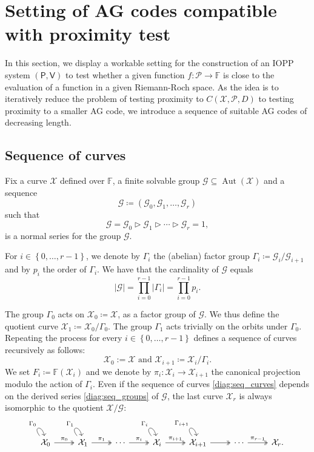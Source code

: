 \documentclass[10pt,a4paper]{article}
\newcommand\F{\mathbb{F}}
\DeclareMathOperator{\Aut}{Aut}
\newcommand\prover{\mathsf{P}}
\newcommand\verifier{\mathsf{V}}
\renewcommand{\vec}[1]{\boldsymbol{#1}}
\newcommand{\set}[1]{\left\{#1\right\}}
\newcommand{\size}[1]{\left|#1\right|}
\newcommand{\range}[1]{\set{0,\dots,#1-1}}
\newcommand\calX{\mathcal{X}}
\newcommand\calP{\mathcal{P}}
\newcommand\calG{\mathcal{G}}
\newcommand\seqG{\vec{\calG}}
\newcommand\mydef{\coloneqq}
\theoremstyle{plain}
\theoremstyle{plain}
\theoremstyle{definition}
\theoremstyle{remark}
\theoremstyle{plain}
\begin{document}
\section{Setting of AG codes compatible with proximity test}\label{sec:foldable}

In this section, we display a workable setting for the construction of an IOPP system $(\prover, \verifier)$ to test whether a given function $f : \calP \rightarrow \F$ is close to the evaluation of a function in a given Riemann-Roch space. As the idea is to iteratively reduce the problem of testing proximity to $C(\calX, \calP, D)$ to testing proximity to a smaller AG code, we introduce a sequence of suitable AG codes of decreasing length.

\subsection{Sequence of curves}\label{subsec:seq-curves}
Fix a curve $\calX$ defined over $\F$, a finite solvable group $\calG \subseteq \Aut(\calX)$ and a sequence \[\seqG \mydef (\calG_0, \calG_1, \dots, \calG_r)\] such that 
\begin{equation}\label{diag:seq_groups}
	\calG=\calG_0 \vartriangleright \calG_1 \vartriangleright \cdots \vartriangleright \calG_r = 1,
\end{equation}
is a normal series for the group $\calG$.

For $i \in \range{r}$, we denote by $\Gamma_i$ the (abelian) factor group $\Gamma_i \mydef \calG_i /\calG_{i+1}$ and by $p_i$ the order of $\Gamma_i$. We have that the cardinality of $\calG$ equals \[\size{\calG}=\prod_{i=0}^{r-1} \size {\Gamma_i} =\prod_{i=0}^{r-1} p_i.\]

The group $\Gamma_0$ acts on $\calX_0\mydef \calX$, as a factor group of $\calG$. We thus define the quotient curve $\calX_1 \mydef \calX_0 / \Gamma_0$. The group $\Gamma_1$ acts trivially on the orbits under $\Gamma_0$. Repeating the process for every ${i \in \range{r}}$ defines a sequence of curves recursively  as follows:
\[\calX_0:=\calX \text{ and } \calX_{i+1} \mydef\calX_i/\Gamma_i.\]
We set $F_i \mydef \F(\calX_i)$ and we denote by $\pi_i: \calX_i \rightarrow \calX_{i+1}$ the canonical projection modulo the action of $\Gamma_i$.
Even if the sequence of curves \eqref{diag:seq_curves} depends on the derived series \eqref{diag:seq_groups} of $\calG$, the last curve $\calX_r$ is always isomorphic to the quotient $\calX / \calG$: \begin{equation}\label{diag:seq_curves}
	\begin{tikzcd}
		\calX_0\arrow[loop, distance=14, out=130, in=100,"\Gamma_0"] \arrow[r, two heads, "\pi_0"] & \calX_1\arrow[loop, distance=14, out=130, in=100,"\Gamma_1"] \arrow[r, two heads, "\pi_1"] & \cdots  \arrow[r, two heads, "\pi_i"] & \calX_i\arrow[loop, distance=14, out=130, in=100,"\Gamma_i"] \arrow[r, two heads, "\pi_{i+1}"]& \calX_{i+1}\arrow[loop, distance=14, out=130, in=100,"\Gamma_{i+1}"] \arrow[r, two heads] & \cdots \arrow[r, two heads,"\pi_{r-1}"] & \calX_{r}.
	\end{tikzcd}
\end{equation}
\end{document}
